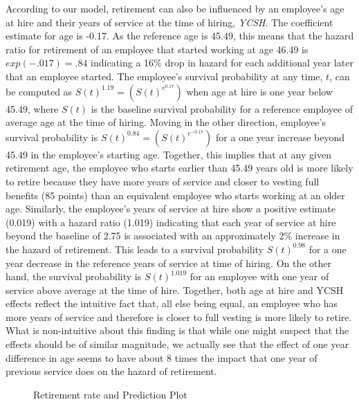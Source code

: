 \documentclass[12pt,letterpaper]{article}
\begin{document}
According to our model, retirement can also be influenced by an employee's age at hire and their years of service at the time of hiring, {\it YCSH}.  The coefficient estimate for age is -0.17. As the reference age is 45.49, this means that the hazard ratio for retirement of an employee that started working at age 46.49 is $exp(-.017)=.84$ indicating a 16\% drop in hazard for each additional year later that an employee started. The employee's survival probability at any time, $t$, can be computed as $S(t)^{1.19} = (S(t)^{e^{0.17}})$ when age at hire is one year below 45.49,  where $S(t)$ is the baseline survival probability for a reference employee of average age at the time of hiring. Moving in the other direction, employee's survival probability is $S(t)^{0.84}=(S(t)^{e^{-0.17}})$ for a one year increase beyond 45.49 in the employee's starting age. Together, this implies that at any given retirement age, the employee who starts earlier than 45.49 years old is more likely to retire because they have more years of service and closer to vesting full benefits (85 points) than an equivalent employee who starts working at an older age. Similarly, the employee's years of service at hire show a positive estimate (0.019) with a hazard ratio (1.019) indicating that each year of service at hire beyond the baseline of 2.75 is associated with an approximately 2\% increase in the hazard of retirement.  This leads to a survival probability $S(t)^{0.98}$ for a one year decrease in the reference years of service at time of hiring.  On the other hand, the survival probability is $S(t)^{1.019}$ for an employee with one year of service above average at the time of hire. Together, both age at hire and YCSH effects reflect the intuitive fact that, all else being equal, an employee who has more years of service and therefore is closer to full vesting is more likely to retire.  What is non-intuitive about this finding is that while one might suspect that the effects should be of similar magnitude, we actually see that the effect of one year difference in age seems to have about 8 times the impact that one year of previous service does on the hazard of retirement.

\begin{figure}[h!]
	\centering
	\caption{Retirement rate and Prediction Plot}
	\label{fig:rerate}
\end{figure}
\end{document}

